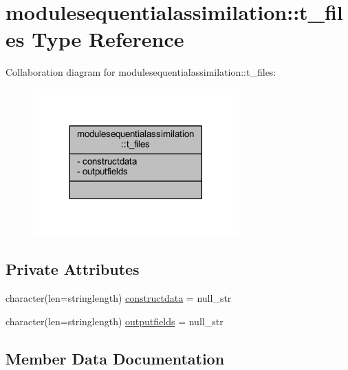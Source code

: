 \hypertarget{structmodulesequentialassimilation_1_1t__files}{}\section{modulesequentialassimilation\+:\+:t\+\_\+files Type Reference}
\label{structmodulesequentialassimilation_1_1t__files}


Collaboration diagram for modulesequentialassimilation\+:\+:t\+\_\+files\+:\nopagebreak
\begin{figure}[H]
\begin{center}
\leavevmode
\includegraphics[width=224pt]{structmodulesequentialassimilation_1_1t__files__coll__graph}
\end{center}
\end{figure}
\subsection*{Private Attributes}
\begin{DoxyCompactItemize}
\item 
character(len=stringlength) \mbox{\hyperlink{structmodulesequentialassimilation_1_1t__files_a677052c3978ee62d16623df961b3e40b}{constructdata}} = null\+\_\+str
\item 
character(len=stringlength) \mbox{\hyperlink{structmodulesequentialassimilation_1_1t__files_ac11217962d838a4c9fc4f75ce1d4c8af}{outputfields}} = null\+\_\+str
\end{DoxyCompactItemize}


\subsection{Member Data Documentation}
\mbox{\label{structmodulesequentialassimilation_1_1t__files_a677052c3978ee62d16623df961b3e40b}} 
